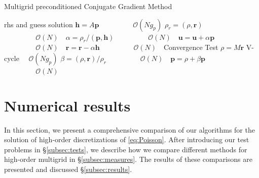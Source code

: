 \documentclass[smallcondensed,final]{svjour3}     %
\newcommand{\bs}[1]{\ensuremath{\boldsymbol #1}}
\begin{document}
\begin{algorithm}[ht] 
  \caption{Multigrid preconditioned Conjugate Gradient Method} \label{alg:pcg} 
  \begin{algorithmic}[1]
    \Require rhs and guess
    \Ensure  solution
    \State $\bs{h} = A \bs{p}$ 											\Comment $~~\quad\quad\quad\quad\mathcal{O}(Ng_p)$
    \State $\rho_r = (\rho, \bs{r})$								\Comment $~~\quad\quad\quad\quad\mathcal{O}(N)~~~$
    \State $\alpha = \rho_r / ( \bs{p}, \bs{h} )$		\Comment $~~\quad\quad\quad\quad\mathcal{O}(N)~~~$
    \State $\bs{u} = \bs{u} + \alpha\bs{p}$					\Comment $~~\quad\quad\quad\quad\mathcal{O}(N)~~~$
    \State $\bs{r} = \bs{r} - \alpha\bs{h}$					\Comment $~~\quad\quad\quad\quad\mathcal{O}(N)~~~$
    \State Convergence Test
    \State $\rho = M\bs{r}$ 												\Comment V-cycle $\quad\mathcal{O}(Ng_p)$
    \State $\beta = (\rho, \bs{r}) / \rho_r$				\Comment $~~\quad\quad\quad\quad\mathcal{O}(N)~~~$
    \State $\bs{p} = \rho + \beta\bs{p}$						\Comment $~~\quad\quad\quad\quad\mathcal{O}(N)~~~$
    \EndWhile
  \end{algorithmic}
\end{algorithm}




\section{Numerical results}\label{sec:numerics}
In this section, we present a comprehensive comparison of our
algorithms for the solution of high-order discretizations of
\eqref{eq:Poisson}.  After introducing our test problems in
\S\ref{subsec:tests}, we describe how we compare different methods for
high-order multigrid in \S\ref{subsec:measures}. The results of these
comparisons are presented and discussed \S\ref{subsec:results}.
\end{document}
